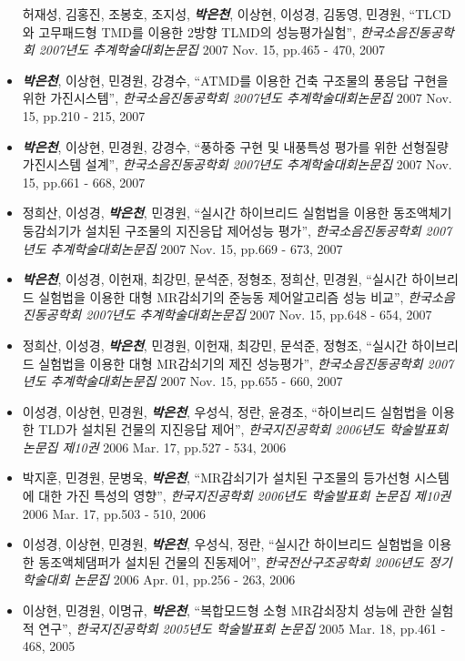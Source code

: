 \begin{itemize}
  허재성, 김홍진, 조봉호, 조지성, \emph{\textbf{박은천}}, 이상현, 이성경,
  김동영, 민경원, ``TLCD와 고무패드형 TMD를 이용한 2방향 TLMD의
  성능평가실험'', \emph{한국소음진동공학회 2007년도 추계학술대회논문집}
  2007 Nov. 15, pp.465 - 470, 2007
\item[]
  \emph{\textbf{박은천}}, 이상현, 민경원, 강경수, ``ATMD를 이용한 건축 구조물의
  풍응답 구현을 위한 가진시스템'', \emph{한국소음진동공학회 2007년도
  추계학술대회논문집} 2007 Nov. 15, pp.210 - 215, 2007
\item[]
  \emph{\textbf{박은천}}, 이상현, 민경원, 강경수, ``풍하중 구현 및 내풍특성
  평가를 위한 선형질량 가진시스템 설계'', \emph{한국소음진동공학회
  2007년도 추계학술대회논문집} 2007 Nov. 15, pp.661 - 668, 2007
\item[]
  정희산, 이성경, \emph{\textbf{박은천}}, 민경원, ``실시간 하이브리드 실험법을
  이용한 동조액체기둥감쇠기가 설치된 구조물의 지진응답 제어성능 평가'',
  \emph{한국소음진동공학회 2007년도 추계학술대회논문집} 2007 Nov. 15,
  pp.669 - 673, 2007
\item[]
  \emph{\textbf{박은천}}, 이성경, 이헌재, 최강민, 문석준, 정형조, 정희산,
  민경원, ``실시간 하이브리드 실험법을 이용한 대형 MR감쇠기의 준능동
  제어알고리즘 성능 비교'', \emph{한국소음진동공학회 2007년도
  추계학술대회논문집} 2007 Nov. 15, pp.648 - 654, 2007
\item[]
  정희산, 이성경, \emph{\textbf{박은천}}, 민경원, 이헌재, 최강민, 문석준,
  정형조, ``실시간 하이브리드 실험법을 이용한 대형 MR감쇠기의 제진
  성능평가'', \emph{한국소음진동공학회 2007년도 추계학술대회논문집} 2007
  Nov. 15, pp.655 - 660, 2007
\item[]
  이성경, 이상현, 민경원, \emph{\textbf{박은천}}, 우성식, 정란, 윤경조,
  ``하이브리드 실험법을 이용한 TLD가 설치된 건물의 지진응답 제어'',
  \emph{한국지진공학회 2006년도 학술발표회 논문집 제10권} 2006 Mar. 17,
  pp.527 - 534, 2006
\item[]
  박지훈, 민경원, 문병욱, \emph{\textbf{박은천}}, ``MR감쇠기가 설치된 구조물의
  등가선형 시스템에 대한 가진 특성의 영향'', \emph{한국지진공학회
  2006년도 학술발표회 논문집 제10권} 2006 Mar. 17, pp.503 - 510, 2006
\item[]
  이성경, 이상현, 민경원, \emph{\textbf{박은천}}, 우성식, 정란, ``실시간
  하이브리드 실험법을 이용한 동조액체댐퍼가 설치된 건물의 진동제어'',
  \emph{한국전산구조공학회 2006년도 정기 학술대회 논문집} 2006 Apr. 01,
  pp.256 - 263, 2006
\item[]
  이상현, 민경원, 이명규, \emph{\textbf{박은천}}, ``복합모드형 소형 MR감쇠장치
  성능에 관한 실험적 연구'', \emph{한국지진공학회 2005년도 학술발표회
  논문집} 2005 Mar. 18, pp.461 - 468, 2005
\end{itemize}

